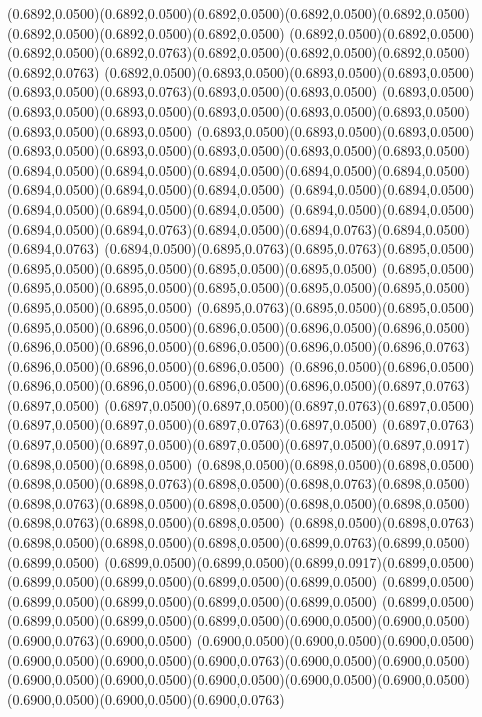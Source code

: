 (0.6892,0.0500)(0.6892,0.0500)(0.6892,0.0500)(0.6892,0.0500)(0.6892,0.0500)(0.6892,0.0500)(0.6892,0.0500)(0.6892,0.0500)
(0.6892,0.0500)(0.6892,0.0500)(0.6892,0.0500)(0.6892,0.0763)(0.6892,0.0500)(0.6892,0.0500)(0.6892,0.0500)(0.6892,0.0763)
(0.6892,0.0500)(0.6893,0.0500)(0.6893,0.0500)(0.6893,0.0500)(0.6893,0.0500)(0.6893,0.0763)(0.6893,0.0500)(0.6893,0.0500)
(0.6893,0.0500)(0.6893,0.0500)(0.6893,0.0500)(0.6893,0.0500)(0.6893,0.0500)(0.6893,0.0500)(0.6893,0.0500)(0.6893,0.0500)
(0.6893,0.0500)(0.6893,0.0500)(0.6893,0.0500)(0.6893,0.0500)(0.6893,0.0500)(0.6893,0.0500)(0.6893,0.0500)(0.6893,0.0500)
(0.6894,0.0500)(0.6894,0.0500)(0.6894,0.0500)(0.6894,0.0500)(0.6894,0.0500)(0.6894,0.0500)(0.6894,0.0500)(0.6894,0.0500)
(0.6894,0.0500)(0.6894,0.0500)(0.6894,0.0500)(0.6894,0.0500)(0.6894,0.0500)
\PST@Solid(0.6894,0.0500)(0.6894,0.0500)(0.6894,0.0500)(0.6894,0.0763)(0.6894,0.0500)(0.6894,0.0763)(0.6894,0.0500)(0.6894,0.0763)
(0.6894,0.0500)(0.6895,0.0763)(0.6895,0.0763)(0.6895,0.0500)(0.6895,0.0500)(0.6895,0.0500)(0.6895,0.0500)(0.6895,0.0500)
(0.6895,0.0500)(0.6895,0.0500)(0.6895,0.0500)(0.6895,0.0500)(0.6895,0.0500)(0.6895,0.0500)(0.6895,0.0500)(0.6895,0.0500)
(0.6895,0.0763)(0.6895,0.0500)(0.6895,0.0500)(0.6895,0.0500)(0.6896,0.0500)(0.6896,0.0500)(0.6896,0.0500)(0.6896,0.0500)
(0.6896,0.0500)(0.6896,0.0500)(0.6896,0.0500)(0.6896,0.0500)(0.6896,0.0763)(0.6896,0.0500)(0.6896,0.0500)(0.6896,0.0500)
(0.6896,0.0500)(0.6896,0.0500)(0.6896,0.0500)(0.6896,0.0500)(0.6896,0.0500)(0.6896,0.0500)(0.6897,0.0763)(0.6897,0.0500)
(0.6897,0.0500)(0.6897,0.0500)(0.6897,0.0763)(0.6897,0.0500)(0.6897,0.0500)(0.6897,0.0500)(0.6897,0.0763)(0.6897,0.0500)
(0.6897,0.0763)(0.6897,0.0500)(0.6897,0.0500)(0.6897,0.0500)(0.6897,0.0500)(0.6897,0.0917)(0.6898,0.0500)(0.6898,0.0500)
(0.6898,0.0500)(0.6898,0.0500)(0.6898,0.0500)(0.6898,0.0500)(0.6898,0.0763)(0.6898,0.0500)(0.6898,0.0763)(0.6898,0.0500)
(0.6898,0.0763)(0.6898,0.0500)(0.6898,0.0500)(0.6898,0.0500)(0.6898,0.0500)(0.6898,0.0763)(0.6898,0.0500)(0.6898,0.0500)
(0.6898,0.0500)(0.6898,0.0763)(0.6898,0.0500)(0.6898,0.0500)(0.6898,0.0500)(0.6899,0.0763)(0.6899,0.0500)(0.6899,0.0500)
(0.6899,0.0500)(0.6899,0.0500)(0.6899,0.0917)(0.6899,0.0500)(0.6899,0.0500)(0.6899,0.0500)(0.6899,0.0500)(0.6899,0.0500)
(0.6899,0.0500)(0.6899,0.0500)(0.6899,0.0500)(0.6899,0.0500)(0.6899,0.0500)
\PST@Solid(0.6899,0.0500)(0.6899,0.0500)(0.6899,0.0500)(0.6899,0.0500)(0.6900,0.0500)(0.6900,0.0500)(0.6900,0.0763)(0.6900,0.0500)
(0.6900,0.0500)(0.6900,0.0500)(0.6900,0.0500)(0.6900,0.0500)(0.6900,0.0500)(0.6900,0.0763)(0.6900,0.0500)(0.6900,0.0500)
(0.6900,0.0500)(0.6900,0.0500)(0.6900,0.0500)(0.6900,0.0500)(0.6900,0.0500)(0.6900,0.0500)(0.6900,0.0500)(0.6900,0.0763)
